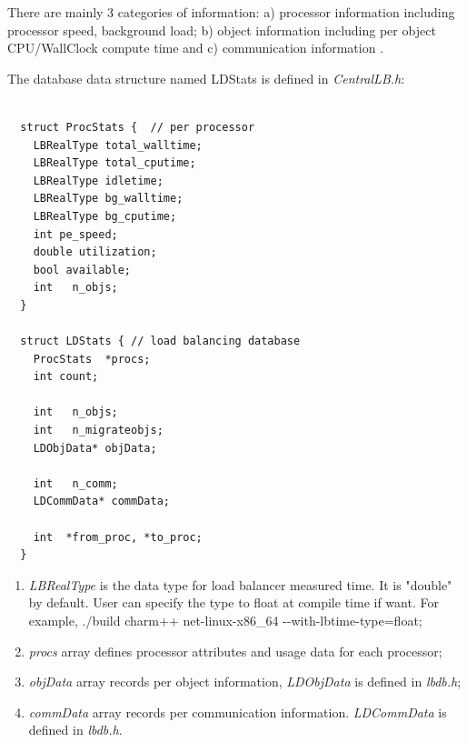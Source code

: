 There are mainly 3 categories of information: a) processor information including processor speed, background load; b) object information including per object
CPU/WallClock compute time and c) communication information .

The database data structure named {\kw LDStats} is defined in {\em CentralLB.h}:

\begin{verbatim}

  struct ProcStats {  // per processor
    LBRealType total_walltime;
    LBRealType total_cputime;
    LBRealType idletime;
    LBRealType bg_walltime;
    LBRealType bg_cputime;
    int pe_speed;
    double utilization;
    bool available;
    int   n_objs;
  }

  struct LDStats { // load balancing database
    ProcStats  *procs;
    int count;

    int   n_objs;
    int   n_migrateobjs;
    LDObjData* objData;

    int   n_comm;
    LDCommData* commData;

    int  *from_proc, *to_proc;
  }

\end{verbatim}

\begin{enumerate}
\item {\em LBRealType} is the data type for load balancer measured time. It is "double" by default. User can specify the type to float at \charmpp{} compile time if want. For example, ./build charm++ net-linux-x86\_64 {-}{-}with-lbtime-type=float;
\item {\em procs} array defines processor attributes and usage data for each
processor;
\item {\em objData} array records per object information, {\em LDObjData} is defined in {\em lbdb.h};
\item {\em commData} array records per communication information. {\em LDCommData} is defined in {\em lbdb.h}.
\end{enumerate}

